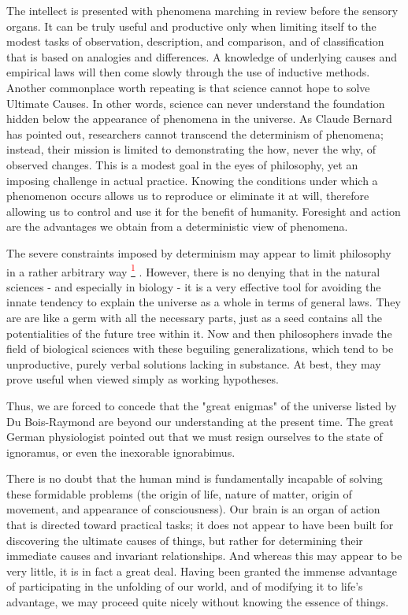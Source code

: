 \documentclass{article}
\newcommand{\noteref}[1]{%
 \hypertarget{ref:#1}{}%
 \hyperlink{note:#1}{\textsuperscript{\textcolor{red}{#1}}}%
}
\begin{document}
The intellect is presented with phenomena marching in review before the sensory organs. It can be truly useful and productive only when limiting itself to the modest tasks of observation, description, and comparison, and of classification that is based on analogies and differences. A knowledge of underlying causes and empirical laws will then come slowly through the use of inductive methods. Another commonplace worth repeating is that science cannot hope to solve Ultimate Causes. In other words, science can never understand the foundation hidden below the appearance of phenomena in the universe. As Claude Bernard has pointed out, researchers cannot transcend the determinism of phenomena; instead, their mission is limited to demonstrating the how, never the why, of observed changes. This is a modest goal in the eyes of philosophy, yet an imposing challenge in actual practice. Knowing the conditions under which a phenomenon occurs allows us to reproduce or eliminate it at will, therefore allowing us to control and use it for the benefit of humanity. Foresight and action are the advantages we obtain from a deterministic view of phenomena.

The severe constraints imposed by determinism may appear to limit philosophy in a rather arbitrary way\noteref{1}. However, there is no denying that in the natural sciences - and especially in biology - it is a very effective tool for avoiding the innate tendency to explain the universe as a whole in terms of general laws. They are are like a germ with all the necessary parts, just as a seed contains all the potentialities of the future tree within it. Now and then philosophers invade the field of biological sciences with these beguiling generalizations, which tend to be unproductive, purely verbal solutions lacking in substance. At best, they may prove useful when viewed simply as working hypotheses.

Thus, we are forced to concede that the "great enigmas" of the universe listed by Du Bois-Raymond are beyond our understanding at the present time. The great German physiologist pointed out that we must resign ourselves to the state of ignoramus, or even the inexorable ignorabimus.

There is no doubt that the human mind is fundamentally incapable of solving these formidable problems (the origin of life, nature of matter, origin of movement, and appearance of consciousness). Our brain is an organ of action that is directed toward practical tasks; it does not appear to have been built for discovering the ultimate causes of things, but rather for determining their immediate causes and invariant relationships. And whereas this may appear to be very little, it is in fact a great deal. Having been granted the immense advantage of participating in the unfolding of our world, and of modifying it to life’s advantage, we may proceed quite nicely without knowing the essence of things.
\end{document}

